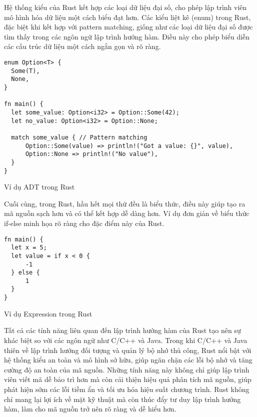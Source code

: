 Hệ thống kiểu của Rust kết hợp các loại dữ liệu đại số, cho phép lập trình viên mô hình hóa dữ liệu một cách biểu đạt hơn. Các kiểu liệt kê (enum) trong Rust, đặc biệt khi kết hợp với pattern matching, giống như các loại dữ liệu đại số được tìm thấy trong các ngôn ngữ lập trình hướng hàm. Điều này cho phép biểu diễn các cấu trúc dữ liệu một cách ngắn gọn và rõ ràng.

\begin{listing}[H]
\begin{verbatim}
enum Option<T> {
  Some(T),
  None,
}

fn main() {
  let some_value: Option<i32> = Option::Some(42);
  let no_value: Option<i32> = Option::None;

  match some_value { // Pattern matching
      Option::Some(value) => println!("Got a value: {}", value),
      Option::None => println!("No value"),
  }
}
\end{verbatim}
\caption{Ví dụ ADT trong Rust}
\label{fp:adt}
\end{listing}

Cuối cùng, trong Rust, hầu hết mọi thứ đều là biểu thức, điều này giúp tạo ra mã nguồn sạch hơn và có thể kết hợp dễ dàng hơn. Ví dụ đơn giản về biểu thức if-else minh họa rõ ràng cho đặc điểm này của Rust.

\begin{listing}[H]
\begin{verbatim}
fn main() {
  let x = 5;
  let value = if x < 0 {
      -1
  } else {
      1
  }
}

\end{verbatim}
\caption{Ví dụ Expression trong Rust}
\label{fp:expression}
\end{listing}

Tất cả các tính năng liên quan đến lập trình hướng hàm của Rust tạo nên sự khác biệt so với các ngôn ngữ như C/C++ và Java. Trong khi C/C++ và Java thiên về lập trình hướng đối tượng và quản lý bộ nhớ thủ công, Rust nổi bật với hệ thống kiểu an toàn và mô hình sở hữu, giúp ngăn chặn các lỗi bộ nhớ và tăng cường độ an toàn của mã nguồn. Những tính năng này không chỉ giúp lập trình viên viết mã dễ bảo trì hơn mà còn cải thiện hiệu quả phân tích mã nguồn, giúp phát hiện sớm các lỗi tiềm ẩn và tối ưu hóa hiệu suất chương trình. Rust không chỉ mang lại lợi ích về mặt kỹ thuật mà còn thúc đẩy tư duy lập trình hướng hàm, làm cho mã nguồn trở nên rõ ràng và dễ hiểu hơn.